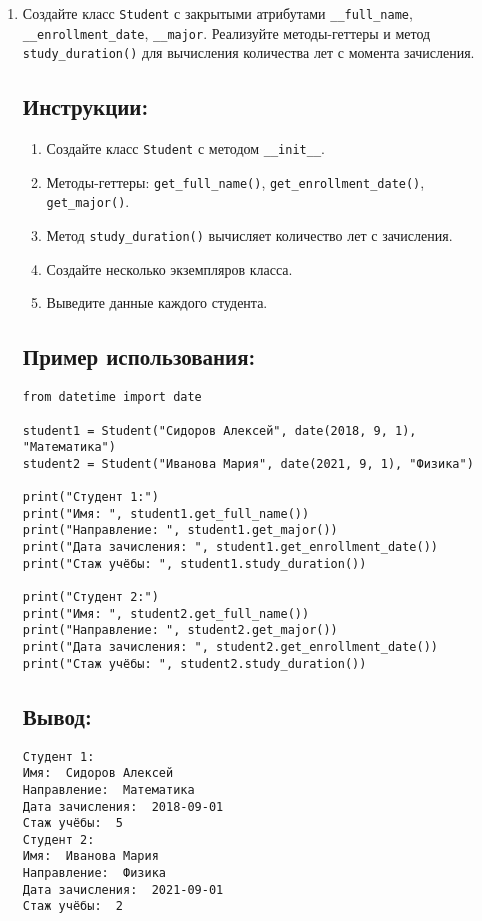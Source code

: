 \begin{enumerate}
\item
Создайте класс \texttt{Student} с закрытыми атрибутами \texttt{\_\_full\_name}, \texttt{\_\_enrollment\_date}, \texttt{\_\_major}. Реализуйте методы-геттеры и метод \texttt{study\_duration()} для вычисления количества лет с момента зачисления.

\subsection*{Инструкции:}
\begin{enumerate}
    \item Создайте класс \texttt{Student} с методом \texttt{\_\_init\_\_}.
    \item Методы-геттеры: \texttt{get\_full\_name()}, \texttt{get\_enrollment\_date()}, \texttt{get\_major()}.
    \item Метод \texttt{study\_duration()} вычисляет количество лет с зачисления.
    \item Создайте несколько экземпляров класса.
    \item Выведите данные каждого студента.
\end{enumerate}

\subsection*{Пример использования:}
\begin{lstlisting}[caption=Пример кода]
from datetime import date

student1 = Student("Сидоров Алексей", date(2018, 9, 1), "Математика")
student2 = Student("Иванова Мария", date(2021, 9, 1), "Физика")

print("Студент 1:")
print("Имя: ", student1.get_full_name())
print("Направление: ", student1.get_major())
print("Дата зачисления: ", student1.get_enrollment_date())
print("Стаж учёбы: ", student1.study_duration())

print("Студент 2:")
print("Имя: ", student2.get_full_name())
print("Направление: ", student2.get_major())
print("Дата зачисления: ", student2.get_enrollment_date())
print("Стаж учёбы: ", student2.study_duration())
\end{lstlisting}

\subsection*{Вывод:}
\begin{lstlisting}[caption=Ожидаемый вывод]
Студент 1:
Имя:  Сидоров Алексей
Направление:  Математика
Дата зачисления:  2018-09-01
Стаж учёбы:  5
Студент 2:
Имя:  Иванова Мария
Направление:  Физика
Дата зачисления:  2021-09-01
Стаж учёбы:  2
\end{lstlisting}


\end{enumerate}
